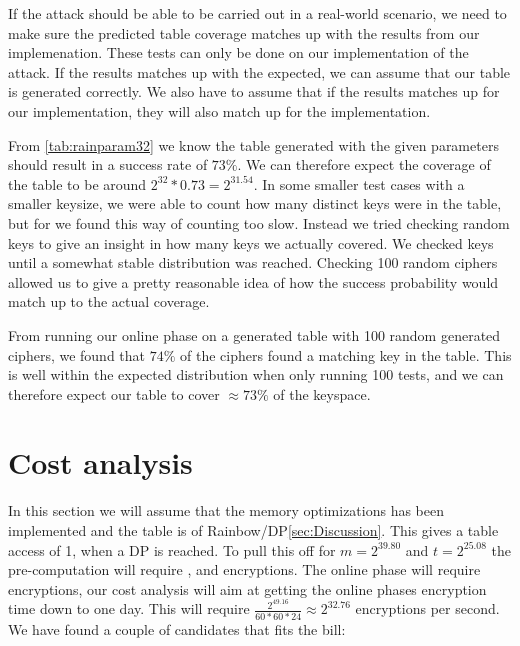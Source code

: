 If the attack should be able to be carried out in a real-world
scenario, we need to make sure the predicted table coverage matches up
with the results from our implemenation. These tests can only be done
on our  implementation of the attack. If the results
matches up with the expected, we can assume that our table is
generated correctly. We also have to assume that if the results
matches up for our  implementation, they will also match
up for the  implementation.

From \ref{tab:rainparam32} we know the table generated with the given
parameters should result in a success rate of $73\%$. We can therefore
expect the coverage of the table to be around $2^{32} * 0.73 =
2^{31.54}$. In some smaller test cases with a smaller keysize, we were
able to count how many distinct keys were in the table, but for
 we found this way of counting too slow. Instead we tried
checking random keys to give an insight in how many keys we
actually covered. We checked keys until a somewhat stable distribution was
reached. Checking 100 random ciphers allowed us to give a pretty
reasonable idea of how the success probability would match up to the
actual coverage.

From running our online phase on a generated table with 100 random
generated ciphers, we found that $74\%$ of the ciphers found a
matching key in the table. This is well within the expected
distribution when only running 100 tests, and we can therefore expect
our table to cover $\approx73\%$ of the keyspace.




\section{Cost analysis}
In this section we will assume that the memory optimizations has been implemented and the table is of Rainbow/DP\ref{sec:Discussion}. This gives a table access of 1, when a DP is reached.
To pull this off for $m=2^{39.80}$ and $t=2^{25.08}$ the pre-computation will require , and  encryptions. The online phase will require  encryptions, our cost analysis will aim at getting the online phases encryption time down to one day. This will require $\frac{2^{49.16}}{60*60*24}\approx 2^{32.76}$ encryptions per second. We have found a couple of candidates that fits the bill:

